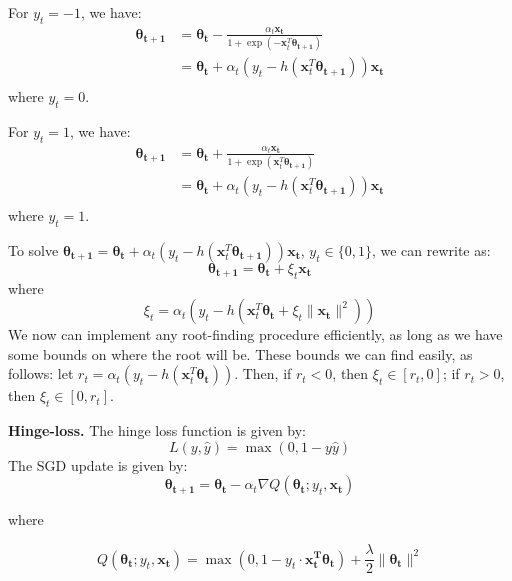 \documentclass{article}
\renewcommand{\vec}[1]{\boldsymbol{#1}}
\begin{document}
\begin{enumerate}[(a)]
For $y_t = -1$, we have:
\begin{align*}
\vec{\theta_{t+1}} &= \vec{\theta_t} - \frac{\alpha_t\vec{x_t}}{1+\exp\left(-\vec{x}_t^{T}\vec{\theta_{t+1}}\right)}\\
&= \vec{\theta_t} + \alpha_t\left( y_t - h(\vec{x}_t^{T}\vec{\theta_{t+1}})\right)\vec{x_t}\\
\end{align*}
where $y_t = 0$.

For $y_t = 1$, we have:
\begin{align*}
\vec{\theta_{t+1}} &= \vec{\theta_t} + \frac{\alpha_t\vec{x_t}}{1+\exp\left(\vec{x}_t^{T}\vec{\theta_{t+1}}\right)}\\
&= \vec{\theta_t} + \alpha_t\left( y_t - h(\vec{x}_t^{T}\vec{\theta_{t+1}})\right)\vec{x_t}\\
\end{align*}
where $y_t = 1$.

To solve $\vec{\theta_{t+1}} = \vec{\theta_t} + \alpha_t\left( y_t - h(\vec{x}_t^{T}\vec{\theta_{t+1}})\right)\vec{x_t}$, $y_t\in\{0, 1\}$, we can rewrite as:
\begin{equation}
\vec{\theta_{t+1}} = \vec{\theta_t} + \xi_t\vec{x_t}
\end{equation}
where
\begin{equation}
\xi_t = \alpha_t \left(y_t - h(\vec{x}_t^{T}\vec{\theta_t} + \xi_t\|\vec{x_t}\|^{2})\right)
\end{equation}
We now can implement any root-finding procedure efficiently, as long as we have some bounds on where the root will be. These bounds we can find easily, as follows: let $r_t = \alpha_t\left(y_t - h(\vec{x}_t^{T}\vec{\theta_t})\right)$. Then, if $r_t < 0$, then $\xi_t \in [r_t, 0]$; if $r_t > 0$, then $\xi_t \in [0, r_t]$.

\textbf{Hinge-loss.} The hinge loss function is given by:
\begin{equation}
L(y, \hat{y}) = \max(0, 1-y\hat{y})
\end{equation}
The SGD update is given by:
\begin{equation}
\vec{\theta_{t+1}} = \vec{\theta_{t}} - \alpha_{t}\nabla Q(\vec{\theta_{t}}; y_t, \vec{x_t})
\end{equation}

where

\begin{equation}
Q(\vec{\theta_{t}}; y_t, \vec{x_t}) = \max(0, 1-y_t\cdot\vec{x_t^{T}}\vec{\theta_t}) + \frac{\lambda}{2}\|\vec{\theta_t}\|^2
\end{equation}


\end{enumerate}
\end{document}
